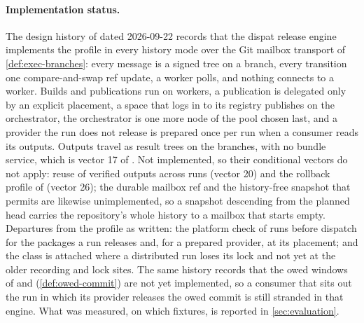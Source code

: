\paragraph{Implementation status.}
The design history of \SPEC{} dated 2026-09-22 records that the dispat
release engine implements the profile in every history mode over the Git
mailbox transport of \cref{def:exec-branches}: every message is a signed tree
on a branch, every transition one compare-and-swap ref update, a worker
polls, and nothing connects to a worker. Builds and publications run on
workers, a publication is delegated only by an explicit placement, a space
that logs in to its registry publishes on the orchestrator, the orchestrator
is one more node of the pool chosen last, and a provider the run does not
release is prepared once per run when a consumer reads its outputs. Outputs
travel as result trees on the branches, with no bundle service, which is
vector 17 of . Not implemented, so their conditional vectors do
not apply: reuse of verified outputs across runs (vector 20) and the rollback
profile of  (vector 26); the durable mailbox ref and the
history-free snapshot that  permits are likewise unimplemented, so
a snapshot descending from the planned head carries the repository's whole
history to a mailbox that starts empty. Departures from the profile as
written: the platform check of  runs before dispatch for the
packages a run releases and, for a prepared provider, at its placement; and
the  class is attached where a distributed run
loses its lock and not yet at the older recording and lock sites. The same
history records that the owed windows of  and 
(\cref{def:owed-commit}) are not yet implemented, so a consumer that sits out
the run in which its provider releases the owed commit is still stranded in
that engine. What was measured, on which fixtures, is reported in
\cref{sec:evaluation}.
